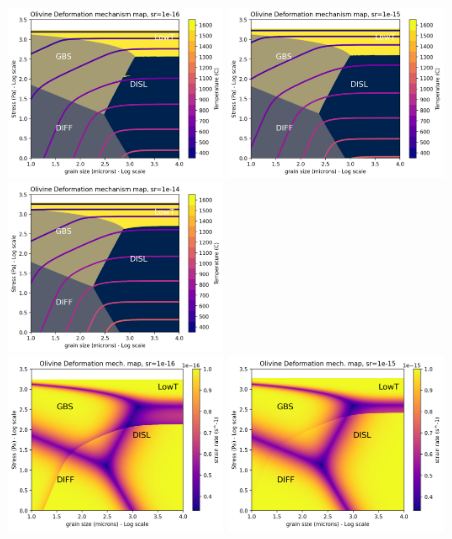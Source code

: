 \begin{center}
\includegraphics[width=5.7cm]{python_codes/fieldstone_121/results/constant_strainrate_deformation_map1_1e-16.png}
\includegraphics[width=5.7cm]{python_codes/fieldstone_121/results/constant_strainrate_deformation_map1.png}
\includegraphics[width=5.7cm]{python_codes/fieldstone_121/results/constant_strainrate_deformation_map1_1e-14.png}\\
\includegraphics[width=5.7cm]{python_codes/fieldstone_121/results/constant_strainrate_deformation_map2_1e-16.png}
\includegraphics[width=5.7cm]{python_codes/fieldstone_121/results/constant_strainrate_deformation_map2.png}

\end{center}
